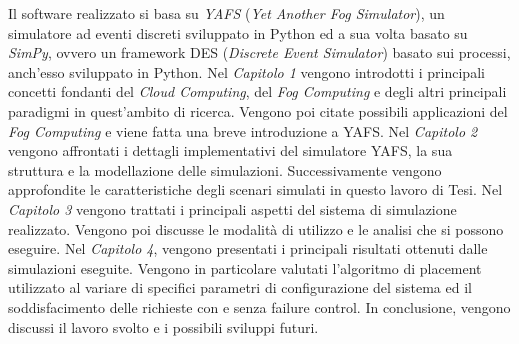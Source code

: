 Il software realizzato si basa su \textit{YAFS} (\textit{Yet Another Fog Simulator}), un simulatore ad eventi discreti sviluppato in Python ed a sua volta basato su \textit{SimPy}, ovvero un framework DES (\textit{Discrete Event Simulator}) basato sui processi, anch'esso sviluppato in Python. Nel \textit{Capitolo 1} vengono introdotti i principali concetti fondanti del \textit{Cloud Computing}, del \textit{Fog Computing} e degli altri principali paradigmi in quest'ambito di ricerca. Vengono poi citate possibili applicazioni del \textit{Fog Computing} e viene fatta una breve introduzione a YAFS. Nel \textit{Capitolo 2} vengono affrontati i dettagli implementativi del simulatore YAFS, la sua struttura e la modellazione delle simulazioni. Successivamente vengono approfondite le caratteristiche degli scenari simulati in questo lavoro di Tesi. Nel \textit{Capitolo 3} vengono trattati i principali aspetti del sistema di simulazione realizzato. Vengono poi discusse le modalità di utilizzo e le analisi che si possono eseguire. Nel \textit{Capitolo 4}, vengono presentati i principali risultati ottenuti dalle simulazioni eseguite. Vengono in particolare valutati l'algoritmo di placement utilizzato al variare di specifici parametri di configurazione del sistema ed il soddisfacimento delle richieste con e senza failure control. In conclusione, vengono discussi il lavoro svolto e i possibili sviluppi futuri.


